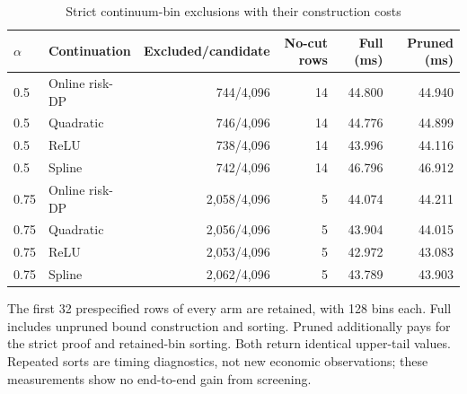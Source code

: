 \begin{table}[htbp]
\caption{Strict continuum-bin exclusions with their construction costs}\label{tab:screens95}
\centering\small
\begin{tabular}{@{}llrrrr@{}}
\toprule
$\alpha$ & Continuation & Excluded/candidate & No-cut rows & Full (ms) & Pruned (ms)\\\midrule
0.5 & Online risk-DP & 744/4,096 & 14 & 44.800 & 44.940\\
0.5 & Quadratic & 746/4,096 & 14 & 44.776 & 44.899\\
0.5 & ReLU & 738/4,096 & 14 & 43.996 & 44.116\\
0.5 & Spline & 742/4,096 & 14 & 46.796 & 46.912\\
0.75 & Online risk-DP & 2,058/4,096 & 5 & 44.074 & 44.211\\
0.75 & Quadratic & 2,056/4,096 & 5 & 43.904 & 44.015\\
0.75 & ReLU & 2,053/4,096 & 5 & 42.972 & 43.083\\
0.75 & Spline & 2,062/4,096 & 5 & 43.789 & 43.903\\
\bottomrule
\end{tabular}
\par\smallskip\begin{minipage}{.98\linewidth}\footnotesize The first 32 prespecified rows of every arm are retained, with 128 bins each. Full includes unpruned bound construction and sorting. Pruned additionally pays for the strict proof and retained-bin sorting. Both return identical upper-tail values. Repeated sorts are timing diagnostics, not new economic observations; these measurements show no end-to-end gain from screening.\end{minipage}
\end{table}

